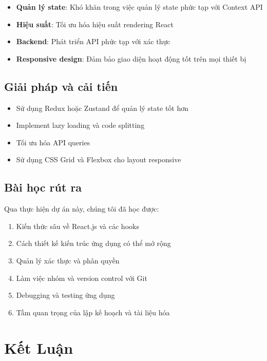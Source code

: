 \documentclass[12pt,a4paper]{report}
\begin{document}
\begin{itemize}
    \item \textbf{Quản lý state}: Khó khăn trong việc quản lý state phức tạp với Context API
    \item \textbf{Hiệu suất}: Tối ưu hóa hiệu suất rendering React
    \item \textbf{Backend}: Phát triển API phức tạp với xác thực
    \item \textbf{Responsive design}: Đảm bảo giao diện hoạt động tốt trên mọi thiết bị
\end{itemize}

\subsection{Giải pháp và cải tiến}

\begin{itemize}
    \item Sử dụng Redux hoặc Zustand để quản lý state tốt hơn
    \item Implement lazy loading và code splitting
    \item Tối ưu hóa API queries
    \item Sử dụng CSS Grid và Flexbox cho layout responsive
\end{itemize}

\subsection{Bài học rút ra}

Qua thực hiện dự án này, chúng tôi đã học được:

\begin{enumerate}
    \item Kiến thức sâu về React.js và các hooks
    \item Cách thiết kế kiến trúc ứng dụng có thể mở rộng
    \item Quản lý xác thực và phân quyền
    \item Làm việc nhóm và version control với Git
    \item Debugging và testing ứng dụng
    \item Tầm quan trọng của lập kế hoạch và tài liệu hóa
\end{enumerate}

\newpage

\section{Kết Luận}
\end{document}
